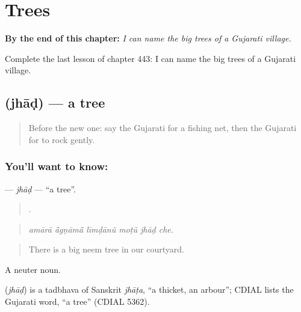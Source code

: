 
\chapter{Trees}
\label{ch:gu-trees}

\begin{chapteropening}
\textbf{By the end of this chapter:} \emph{I can name the big trees of a Gujarati village.}

Complete the last lesson of chapter 443: I can name the big trees of a Gujarati village.
\end{chapteropening}

\section[\texorpdfstring{\gu{ઝાડ} (jhāḍ)}{ઝાડ (jhāḍ)}]{ (jhāḍ) — a tree}

\label{lesson:GU-C443-jhad}



\begin{quote}
Before the new one: say the Gujarati for a fishing net, then the Gujarati for to rock gently.
\end{quote}

\subsection*{You'll want to know: }
\textbf{} — \emph{jhāḍ} — \textquotedblleft{}a tree\textquotedblright{}.

\begin{quote}
     .
\end{quote}

\begin{quote}
\emph{amārā ā̃gṇāmā̃ līmḍānũ moṭũ jhāḍ che.}
\end{quote}

\begin{quote}
There is a big neem tree in our courtyard.
\end{quote}

A neuter noun.

\begin{cousinweb}
\textbf{} (\emph{jhāḍ}) is a tadbhava of Sanskrit \emph{jhāṭa}, \textquotedblleft{}a thicket, an arbour\textquotedblright{}; CDIAL lists the Gujarati word, \textquotedblleft{}a tree\textquotedblright{} (CDIAL 5362).
\end{cousinweb}

